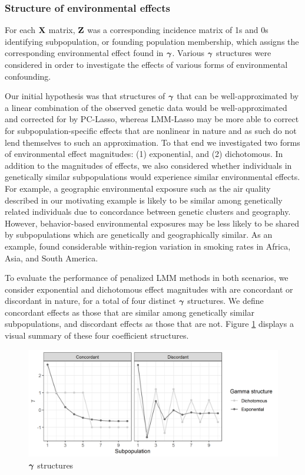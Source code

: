 \subsubsection{Structure of environmental effects}
For each $\textbf{X}$ matrix, $\textbf{Z}$ was a corresponding incidence matrix of 1s and 0s identifying subpopulation, or founding population membership, which assigns the corresponding environmental effect found in $\boldsymbol{\gamma}$. Various $\boldsymbol{\gamma}$ structures were considered in order to investigate the effects of various forms of environmental confounding. 

 Our initial hypothesis was that structures of $\boldsymbol{\gamma}$ that can be well-approximated by a linear combination of the observed genetic data would be well-approximated and corrected for by PC-Lasso, whereas LMM-Lasso may be more able to correct for subpopulation-specific effects that are nonlinear in nature and as such do not lend themselves to such an approximation. To that end we investigated two forms of environmental effect magnitudes: (1) exponential, and (2) dichotomous. In addition to the magnitudes of effects, we also considered whether individuals in genetically similar subpopulations would experience similar environmental effects. For example, a geographic environmental exposure such as the air quality described in our motivating example is likely to be similar among genetically related individuals due to concordance between genetic clusters and geography. However, behavior-based environmental exposures may be less likely to be shared by subpopulations which are genetically and geographically similar. As an example, \citet{ng2014smoking} found considerable within-region variation in smoking rates in Africa, Asia, and South America.

 To evaluate the performance of penalized LMM methods in both scenarios, we consider exponential and dichotomous effect magnitudes with are concordant or discordant in nature, for a total of four distinct $\boldsymbol{\gamma}$ structures. We define concordant effects as those that are similar among genetically similar subpopulations, and discordant effects as those that are not. Figure \ref{fig:gamma_structures} displays a visual summary of these four coefficient structures. 
\begin{figure}[H]
    \centering
    \includegraphics[scale = 0.9]{figures/gamma_structure.png}
    \caption{$\boldsymbol{\gamma}$ structures}
    \label{fig:gamma_structures}
\end{figure}



